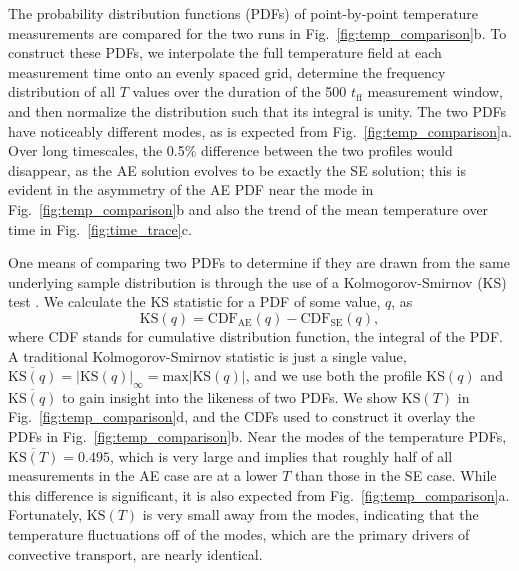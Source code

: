 \documentclass[aps, pre, onecolumn, nofootinbib, notitlepage, groupedaddress, amsfonts, amssymb, amsmath, longbibliography]{revtex4-1}
\newcommand{\KS}[1]{\ensuremath{\text{KS}(#1)}}
\newcommand{\KSstat}[1]{\ensuremath{\overline{\text{KS}(#1)}}}
\begin{document}
The probability distribution functions (PDFs)
of point-by-point temperature measurements are compared for the two runs
in Fig.~\ref{fig:temp_comparison}b. To construct these PDFs, 
we interpolate the full temperature field
at each measurement time onto an evenly spaced grid, determine the
frequency distribution of all $T$ values over the duration of the 500 $t_{\text{ff}}$
measurement window, and then normalize the
distribution such that its integral is unity.  The two PDFs have noticeably
different modes, as is expected from Fig.~\ref{fig:temp_comparison}a. 
Over long timescales, the 0.5\% difference between the two profiles would
disappear, as the AE solution evolves to be exactly the SE solution; this
is evident in the asymmetry of the AE PDF near the mode
in Fig.~\ref{fig:temp_comparison}b and also
the trend of the mean temperature over time in Fig.~\ref{fig:time_trace}c.

One means of comparing two
PDFs to determine if they are drawn from the same underlying
sample distribution is through the use of a Kolmogorov-Smirnov (KS) test \cite{wall&jenkins2012}.
We calculate the KS statistic for a PDF of some value, $q$, as
\begin{equation}
\KS{q} = \text{CDF}_{\text{AE}}(q) - \text{CDF}_{\text{SE}}(q),
\label{eqn:ks_profile}
\end{equation}
where CDF stands for cumulative distribution function, the integral of the PDF.
A traditional Kolmogorov-Smirnov statistic is just a single value,
$\KSstat{q} = |\KS{q}|_\infty =
\text{max} |\KS{q}|$, and we use both the profile KS$(q)$ and
$\KSstat{q}$ to gain insight into the likeness of two PDFs. 
We show $\KS{T}$ in Fig.~\ref{fig:temp_comparison}d, and the
CDFs used to construct it overlay the PDFs in Fig.~\ref{fig:temp_comparison}b.
Near the modes of the temperature PDFs, $\KSstat{T} = 0.495$, 
which is very large and implies that roughly half of all
measurements in the AE case are at a lower $T$ than those in the SE case.
While this difference is significant, it is also expected from Fig.~\ref{fig:temp_comparison}a.
Fortunately, $\KS{T}$ is very small away from the modes, 
indicating that the temperature fluctuations off of the modes, which are the primary
drivers of convective transport, are nearly identical.
\end{document}
